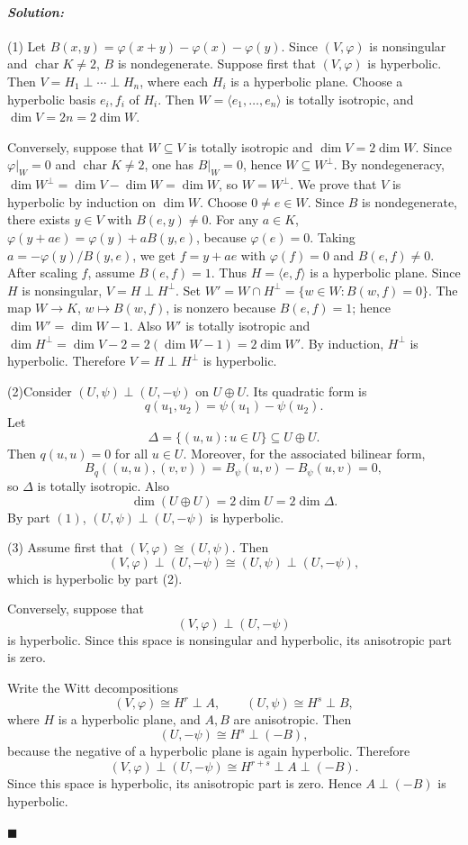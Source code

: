 \documentclass[12pt, a4paper]{article}
\newenvironment{solution}
  {\paragraph{\textit{Solution:}}\par\medskip}
  {\hfill$\blacksquare$\vspace{0.1cm}}
\begin{document}
\begin{solution}
    (1) Let $B(x,y)=\varphi(x+y)-\varphi(x)-\varphi(y)$. Since $(V,\varphi)$ is nonsingular and $\operatorname{char}K\neq 2$, $B$ is nondegenerate. Suppose first that $(V,\varphi)$ is hyperbolic. Then $V=H_1\perp\cdots\perp H_n$, where each $H_i$ is a hyperbolic plane. Choose a hyperbolic basis $e_i,f_i$ of $H_i$. Then $W=\langle e_1,\dots,e_n\rangle$ is totally isotropic, and $\dim V=2n=2\dim W$. 
    
    Conversely, suppose that $W\subseteq V$ is totally isotropic and $\dim V=2\dim W$. Since $\varphi|_W=0$ and $\operatorname{char}K\neq 2$, one has $B|_{W}=0$, hence $W\subseteq W^\perp$. By nondegeneracy, $\dim W^\perp=\dim V-\dim W=\dim W$, so $W=W^\perp$. We prove that $V$ is hyperbolic by induction on $\dim W$. Choose $0\neq e\in W$. Since $B$ is nondegenerate, there exists $y\in V$ with $B(e,y)\neq 0$. For any $a\in K$, $\varphi(y+ae)=\varphi(y)+aB(y,e)$, because $\varphi(e)=0$. Taking $a=-\varphi(y)/B(y,e)$, we get $f=y+ae$ with $\varphi(f)=0$ and $B(e,f)\neq 0$. After scaling $f$, assume $B(e,f)=1$. Thus $H=\langle e,f\rangle$ is a hyperbolic plane. Since $H$ is nonsingular, $V=H\perp H^\perp$. Set $W'=W\cap H^\perp=\{w\in W:B(w,f)=0\}$. The map $W\to K$, $w\mapsto B(w,f)$, is nonzero because $B(e,f)=1$; hence $\dim W'=\dim W-1$. Also $W'$ is totally isotropic and $\dim H^\perp=\dim V-2=2(\dim W-1)=2\dim W'$. By induction, $H^\perp$ is hyperbolic. Therefore $V=H\perp H^\perp$ is hyperbolic.

    (2)Consider $(U,\psi)\perp (U,-\psi)$ on $U\oplus U$. Its quadratic form is \[ q(u_1,u_2)=\psi(u_1)-\psi(u_2). \] Let \[ \Delta=\{(u,u):u\in U\}\subseteq U\oplus U. \] Then $q(u,u)=0$ for all $u\in U$. Moreover, for the associated bilinear form, \[ B_q((u,u),(v,v))=B_\psi(u,v)-B_\psi(u,v)=0, \] so $\Delta$ is totally isotropic. Also \[ \dim(U\oplus U)=2\dim U=2\dim \Delta. \] By part $(1)$, $(U,\psi)\perp (U,-\psi)$ is hyperbolic.

(3) Assume first that \((V,\varphi)\cong (U,\psi)\). Then
\[
(V,\varphi)\perp (U,-\psi)
\cong
(U,\psi)\perp (U,-\psi),
\]
which is hyperbolic by part (2).

Conversely, suppose that
\[
(V,\varphi)\perp (U,-\psi)
\]
is hyperbolic. Since this space is nonsingular and hyperbolic, its anisotropic
part is zero.

Write the Witt decompositions
\[
(V,\varphi)\cong H^r\perp A,
\qquad
(U,\psi)\cong H^s\perp B,
\]
where \(H\) is a hyperbolic plane, and \(A,B\) are anisotropic. Then
\[
(U,-\psi)\cong H^s\perp (-B),
\]
because the negative of a hyperbolic plane is again hyperbolic. Therefore
\[
(V,\varphi)\perp (U,-\psi)
\cong
H^{r+s}\perp A\perp (-B).
\]
Since this space is hyperbolic, its anisotropic part is zero. Hence
\(A\perp (-B)\) is hyperbolic.


\end{solution}
\end{document}
